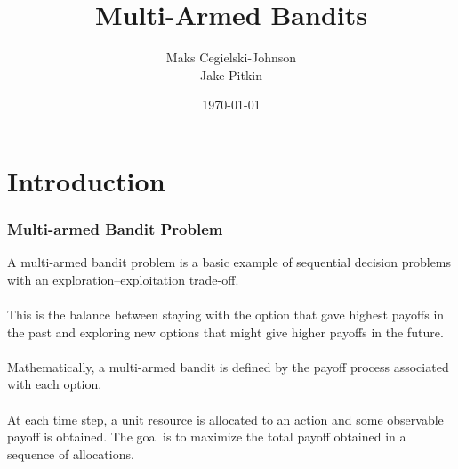 \documentclass{beamer}
\title[Bandits]{Multi-Armed Bandits} %
\author[Cegielski-Johnson/Pitkin]{Maks Cegielski-Johnson\\Jake Pitkin} %
\institute[Utah] %
{
University of Utah \\ %
}
\date{\today} %
\begin{document}
\begin{frame}
\titlepage %
\end{frame}


\section{Introduction} %


\begin{frame}
\frametitle{Multi-armed Bandit Problem}
A multi-armed bandit problem is a basic example of sequential decision problems with an exploration–exploitation trade-off. \\~\\

This is the balance between staying with the option that gave highest payoffs in the past and exploring new options that might give higher payoffs in the future. \\~\\

Mathematically, a multi-armed bandit is defined by the payoff process associated with each option.\\~\\

At each time step, a unit resource is allocated to an action and some observable payoff is obtained. The goal is to maximize the total payoff obtained in a sequence of allocations.

\end{frame}
\end{document}
